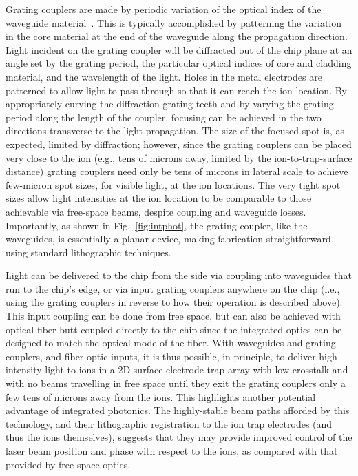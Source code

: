 \documentclass[%
12pt,
 amsmath,amssymb,
]{revtex4-2}
\begin{document}
Grating couplers are made by periodic variation of the optical index of the waveguide material~\cite{HeitmannGratingCoupler1981}.  This is typically accomplished by patterning the variation in the core material at the end of the waveguide along the propagation direction.  Light incident on the grating coupler will be diffracted out of the chip plane at an angle set by the grating period, the particular optical indices of core and cladding material, and the wavelength of the light. Holes in the metal electrodes are patterned to allow light to pass through so that it can reach the ion location. By appropriately curving the diffraction grating teeth and by varying the grating period along the length of the coupler, focusing can be achieved in the two directions transverse to the light propagation.  The size of the focused spot is, as expected, limited by diffraction; however, since the grating couplers can be placed very close to the ion (e.g., tens of microns away, limited by the ion-to-trap-surface distance) grating couplers need only be tens of microns in lateral scale to achieve few-micron spot sizes, for visible light, at the ion locations. The very tight spot sizes allow light intensities at the ion location to be comparable to those achievable via free-space beams, despite coupling and waveguide losses. Importantly, as shown in Fig.~\ref{fig:intphot}, the grating coupler, like the waveguides, is essentially a planar device, making fabrication straightforward using standard lithographic techniques.

Light can be delivered to the chip from the side via coupling into waveguides that run to the chip's edge, or via input grating couplers anywhere on the chip (i.e., using the grating couplers in reverse to how their operation is described above). This input coupling can be done from free space, but can also be achieved with optical fiber butt-coupled directly to the chip since the integrated optics can be designed to match the optical mode of the fiber.  With waveguides and grating couplers, and fiber-optic inputs, it is thus possible, in principle, to deliver high-intensity light to ions in a 2D surface-electrode trap array with low crosstalk and with no beams travelling in free space until they exit the grating couplers only a few tens of microns away from the ions.  This highlights another potential advantage of integrated photonics. The highly-stable beam paths afforded by this technology, and their lithographic registration to the ion trap electrodes (and thus the ions themselves), suggests that they may provide improved control of the laser beam position and phase with respect to the ions, as compared with that provided by free-space optics.
\end{document}

